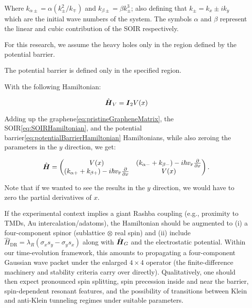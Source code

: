 \noindent Where $k_{\alpha\pm} = \alpha\left(k_{\pm}^2/k_{\mp}\right)$ and $k_{\beta\pm} = \beta k_{\pm}^3$; also defining that $k_{\pm}=k_x\pm i k_y$ which are the initial wave numbers of the system.
The symbols $\alpha$ and $\beta$ represent the linear and cubic contribution of the SOIR respectively.




For this research, we assume the heavy holes only in the region defined by the potential barrier.

The potential barrier is defined only in the specified region.

With the following Hamiltonian:

\begin{equation}
    \label{eq:potentialBarrierHamiltonian}
    \hat{\mbox{\boldmath $H$}}_V=\mbox{\boldmath $I$}_2 V(x)
\end{equation}

Adding up the graphene\eqref{eq:pristineGrapheneMatrix}, the SOIR\eqref{eq:SOIRHamiltonian}, and the potential barrier\eqref{eq:potentialBarrierHamiltonian} Hamiltonians, while also zeroing the parameters in the $y$ direction, we get:

\begin{equation}
    \label{eq:hybridHamiltonian}
    \hat{\mbox{\boldmath $H$}}=
    \begin{pmatrix}
        V(x) & \left(k_{\alpha-}+k_{\beta-}\right)-i\hbar v_{\mbox{\tiny F}}\frac{\partial}{\partial x} \\
        \left(k_{\alpha+}+k_{\beta+}\right)-i\hbar v_{\mbox{\tiny F}}\frac{\partial}{\partial x} & V(x)
    \end{pmatrix}.
\end{equation}

Note that if we wanted to see the results in the $y$ direction, we would have to zero the partial derivatives of $x$.

If the experimental context implies a giant Rashba coupling (e.g., proximity to TMDs, Au intercalation/adatoms), the Hamiltonian should be augmented to
(i) a four-component spinor (sublattice $\otimes$ real spin) and
(ii) include $\hat{H}_{\mathrm{DR}}=\lambda_R(\sigma_x s_y-\sigma_y s_x)$ along with $\hat{\mbox{\boldmath $H$}}_G$ and the electrostatic potential.
Within our time-evolution framework, this amounts to propagating a four-component Gaussian wave packet under the enlarged $4\times 4$ operator (the finite-difference machinery and stability criteria carry over directly).
Qualitatively, one should then expect pronounced spin splitting, spin precession inside and near the barrier, spin-dependent resonant features, and the possibility of transitions between Klein and anti-Klein tunneling regimes under suitable parameters\cite{DellAnnaJPhysCondMatt2018, AvsarNatCommun2014, WangPhysRevX2016}.

